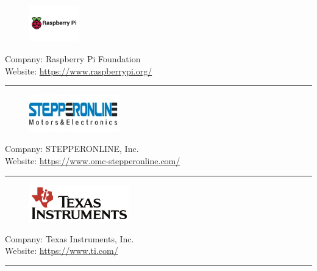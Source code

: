 \begin{figure}[h!]
\includegraphics[height=1.6cm]{Pictures/Raspberry_Pi_Logo.jpg}
\end{figure}
\vspace{3mm}
Company:  Raspberry Pi Foundation\\
Website: \url{https://www.raspberrypi.org/}
\vspace{5mm}
\hrule
\vspace{10mm}

\begin{figure}[h!]
\includegraphics[height=1.6cm]{Pictures/StepperonlineLogo.jpg}
\end{figure}
\vspace{3mm}
Company:  STEPPERONLINE, Inc.\\
Website: \url{https://www.omc-stepperonline.com/}
\vspace{5mm}
\hrule
\vspace{10mm}

\begin{figure}[h!]
\includegraphics[height=1.6cm]{Pictures/TexasInstruments-Logo.png}
\end{figure}
\vspace{3mm}
Company: Texas Instruments, Inc.\\
Website: \url{https://www.ti.com/}
\vspace{5mm}
\hrule
\vspace{10mm}


